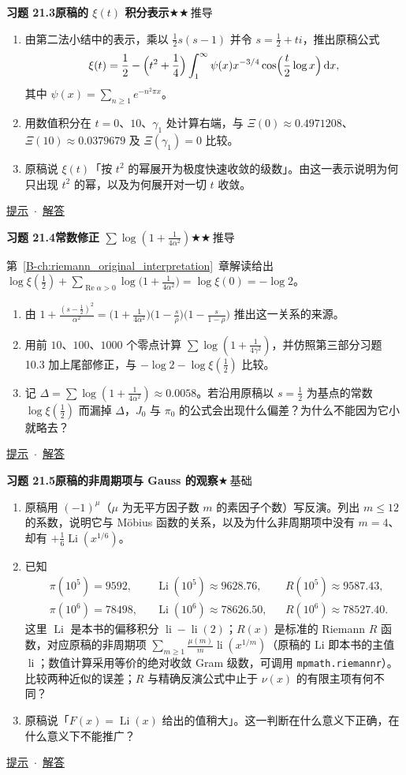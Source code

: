 \documentclass[11pt,a4paper]{article}
\DeclareMathOperator{\Li}{Li}
\DeclareMathOperator{\li}{li}
\newcommand{\dd}{\,\mathrm{d}}
\renewcommand{\Re}{\operatorname{Re}}
\newcommand{\bref}[1]{\ref*{B-#1}}
\newcommand{\lvI}{$\bigstar$\,基础}
\newcommand{\lvII}{$\bigstar\bigstar$\,推导}
\newcommand{\Q}[3]{%
  \par\addvspace{1.1em}\noindent
  \hypertarget{q:#1}{}\textbf{习题 #1}\quad\textbf{#3}\hfill{\small #2}\par
  \nopagebreak\smallskip}
\newcommand{\toHint}[1]{\hfill{\small\hyperlink{h:#1}{提示}\ $\cdot$\ \hyperlink{s:#1}{解答}}}
\begin{document}
\Q{21.3}{\lvII}{原稿的 $\xi(t)$ 积分表示}
\begin{enumerate}
  \item 由第二法小结中的表示，乘以 $\frac12s(s-1)$ 并令 $s=\frac12+ti$，推出原稿公式
  \[
    \xi(t)=\frac12-\Bigl(t^2+\frac14\Bigr)\int_1^\infty\psi(x)x^{-3/4}\cos\Bigl(\frac t2\log x\Bigr)\dd x ,
  \]
  其中 $\psi(x)=\sum_{n\ge1}e^{-n^2\pi x}$。
  \item 用数值积分在 $t=0$、$10$、$\gamma_1$ 处计算右端，与 $\Xi(0)\approx0.4971208$、$\Xi(10)\approx0.0379679$ 及 $\Xi(\gamma_1)=0$ 比较。
  \item 原稿说 $\xi(t)$「按 $t^2$ 的幂展开为极度快速收敛的级数」。由这一表示说明为何只出现 $t^2$ 的幂，以及为何展开对一切 $t$ 收敛。
\end{enumerate}
\toHint{21.3}

\Q{21.4}{\lvII}{常数修正 $\sum\log(1+\frac1{4\alpha^2})$}
第~\bref{ch:riemann_original_interpretation}~章解读给出 $\log\xi(\frac12)+\sum_{\Re\alpha>0}\log\bigl(1+\frac1{4\alpha^2}\bigr)=\log\xi(0)=-\log2$。
\begin{enumerate}
  \item 由 $1+\frac{(s-\frac12)^2}{\alpha^2}=\bigl(1+\frac1{4\alpha^2}\bigr)\bigl(1-\frac s\rho\bigr)\bigl(1-\frac s{1-\rho}\bigr)$ 推出这一关系的来源。
  \item 用前 $10$、$100$、$1000$ 个零点计算 $\sum\log(1+\frac1{4\gamma^2})$，并仿照第三部分习题 10.3 加上尾部修正，与 $-\log2-\log\xi(\frac12)$ 比较。
  \item 记 $\Delta=\sum\log(1+\frac1{4\alpha^2})\approx0.0058$。若沿用原稿以 $s=\frac12$ 为基点的常数 $\log\xi(\frac12)$ 而漏掉 $\Delta$，$J_0$ 与 $\pi_0$ 的公式会出现什么偏差？为什么不能因为它小就略去？
\end{enumerate}
\toHint{21.4}

\Q{21.5}{\lvI}{原稿的非周期项与 Gauss 的观察}
\begin{enumerate}
  \item 原稿用 $(-1)^\mu$（$\mu$ 为无平方因子数 $m$ 的素因子个数）写反演。列出 $m\le12$ 的系数，说明它与 Möbius 函数的关系，以及为什么非周期项中没有 $m=4$、却有 $+\frac16\Li(x^{1/6})$。
  \item 已知
  \[
    \begin{aligned}
    &\pi(10^5)=9592,&&\Li(10^5)\approx9628.76,&&R(10^5)\approx9587.43,\\
    &\pi(10^6)=78498,&&\Li(10^6)\approx78626.50,&&R(10^6)\approx78527.40.
    \end{aligned}
  \]
  这里 $\Li$ 是本书的偏移积分 $\li-\li(2)$；$R(x)$ 是标准的 Riemann $R$ 函数，对应原稿的非周期项 $\sum_{m\ge1}\frac{\mu(m)}m\li(x^{1/m})$（原稿的 $\mathrm{Li}$ 即本书的主值 $\li$；数值计算采用等价的绝对收敛 Gram 级数，可调用 \texttt{mpmath.riemannr}）。比较两种近似的误差；$R$ 与精确反演公式中止于 $\nu(x)$ 的有限主项有何不同？
  \item 原稿说「$F(x)=\Li(x)$ 给出的值稍大」。这一判断在什么意义下正确，在什么意义下不能推广？
\end{enumerate}
\toHint{21.5}
\end{document}
